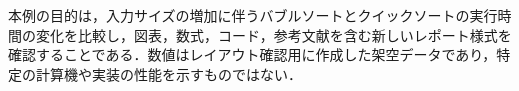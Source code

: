 本例の目的は，入力サイズの増加に伴うバブルソートとクイックソートの実行時間の変化を比較し，図表，数式，コード，参考文献を含む新しいレポート様式を確認することである．数値はレイアウト確認用に作成した架空データであり，特定の計算機や実装の性能を示すものではない．
